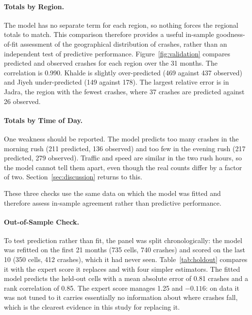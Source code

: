 \documentclass[11pt]{article}
\begin{document}
\paragraph{Totals by Region.}

The model has no separate term for each region, so nothing forces the regional totals to match. This comparison therefore provides a useful in-sample
goodness-of-fit assessment of the geographical distribution of crashes, rather than an independent test of predictive performance.
Figure~\ref{fig:validation} compares predicted and observed crashes for each region over the 31 months. The correlation is 0.990. Khalde is slightly over-predicted (469 against 437 observed) and Jiyeh under-predicted (149 against 178). The largest relative error is in Jadra, the region with the fewest crashes, where 37 crashes are predicted against 26 observed.

\paragraph{Totals by Time of Day.}
One weakness should be reported. The model predicts too many crashes in the
morning rush (211 predicted, 136 observed) and too few in the evening rush (217
predicted, 279 observed). Traffic and speed are similar in the two rush hours,
so the model cannot tell them apart, even though the real counts differ by a
factor of two. Section~\ref{sec:discussion} returns to this.


These three checks use the same data on which the model was fitted and therefore assess in-sample agreement rather than predictive performance.

\paragraph{Out-of-Sample Check.}
\label{sec:holdout_validation}
To test prediction rather than fit, the panel was split chronologically: the
model was refitted on the first 21 months (735 cells, 740 crashes) and scored
on the last 10 (350 cells, 412 crashes), which it had never seen.
Table~\ref{tab:holdout} compares it with the expert score it replaces and with
four simpler estimators. The fitted model predicts the held-out cells with a
mean absolute error of 0.81 crashes and a rank correlation of 0.85. The expert
score manages 1.25 and $-0.116$: on data it was not tuned to it carries
essentially no information about where crashes fall, which is the clearest
evidence in this study for replacing it.
\end{document}
